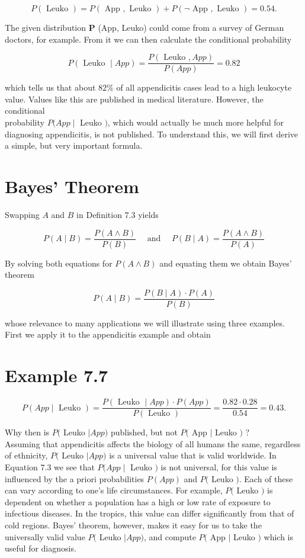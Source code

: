 \documentclass[10pt]{article}
\begin{document}
$$
P(\text { Leuko })=P(\text { App }, \text { Leuko })+P(\neg \text { App }, \text { Leuko })=0.54 .
$$

The given distribution $\boldsymbol{P}$ (App, Leuko) could come from a survey of German doctors, for example. From it we can then calculate the conditional probability

$$
P(\text { Leuko } \mid A p p)=\frac{P(\text { Leuko }, A p p)}{P(A p p)}=0.82
$$

which tells us that about $82 \%$ of all appendicitis cases lead to a high leukocyte value. Values like this are published in medical literature. However, the conditional\\
probability $P(A p p \mid$ Leuko $)$, which would actually be much more helpful for diagnosing appendicitis, is not published. To understand this, we will first derive a simple, but very important formula.

\section*{Bayes' Theorem}
Swapping $A$ and $B$ in Definition 7.3 yields

$$
P(A \mid B)=\frac{P(A \wedge B)}{P(B)} \quad \text { and } \quad P(B \mid A)=\frac{P(A \wedge B)}{P(A)}
$$

By solving both equations for $P(A \wedge B)$ and equating them we obtain Bayes’ theorem


\begin{equation*}
P(A \mid B)=\frac{P(B \mid A) \cdot P(A)}{P(B)} \tag{7.2}
\end{equation*}


whose relevance to many applications we will illustrate using three examples. First we apply it to the appendicitis example and obtain

\section*{Example 7.7}

\begin{equation*}
P(A p p \mid \text { Leuko })=\frac{P(\text { Leuko } \mid A p p) \cdot P(A p p)}{P(\text { Leuko })}=\frac{0.82 \cdot 0.28}{0.54}=0.43 . \tag{7.3}
\end{equation*}


Why then is $P($ Leuko $\mid A p p)$ published, but not $P($ App $\mid$ Leuko $)$ ?\\
Assuming that appendicitis affects the biology of all humans the same, regardless of ethnicity, $P($ Leuko $\mid A p p)$ is a universal value that is valid worldwide. In Equation 7.3 we see that $P(A p p \mid$ Leuko $)$ is not universal, for this value is influenced by the a priori probabilities $P(A p p)$ and $P($ Leuko $)$. Each of these can vary according to one's life circumstances. For example, $P($ Leuko $)$ is dependent on whether a population has a high or low rate of exposure to infectious diseases. In the tropics, this value can differ significantly from that of cold regions. Bayes' theorem, however, makes it easy for us to take the universally valid value $P($ Leuko $\mid A p p)$, and compute $P($ App $\mid$ Leuko $)$ which is useful for diagnosis.
\end{document}

